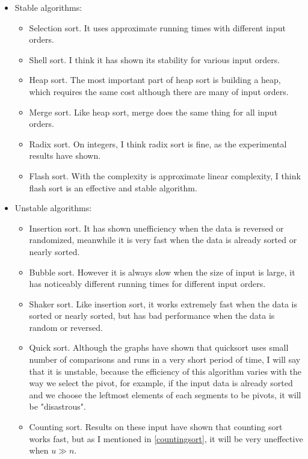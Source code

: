 \documentclass[12pt,a4paper]{article}
\begin{document}
\begin{itemize}
 \item Stable algorithms: 
 \begin{itemize}
  \item Selection sort. It uses approximate running times with different input orders.
  \item Shell sort. I think it has shown its stability for various input orders.
  \item Heap sort. The most important part of heap sort is building a heap, which requires the same cost although there are many of input orders.
  \item Merge sort. Like heap sort, merge does the same thing for all input orders.
  \item Radix sort. On integers, I think radix sort is fine, as the experimental results have shown.
  \item Flash sort. With the complexity is approximate linear complexity, I think flash sort is an effective and stable algorithm.
  \end{itemize} 
  \item Unstable algorithms:
  \begin{itemize}
  \item Insertion sort. It has shown unefficiency when the data is reversed or randomized, meanwhile it is very fast when the data is already sorted or nearly sorted.
  \item Bubble sort. However it is always slow when the size of input is large, it has noticeably different running times for different input orders.
  \item Shaker sort. Like insertion sort, it works extremely fast when the data is sorted or nearly sorted, but has bad performance when the data is random or reversed.
  \item Quick sort. Although the graphs have shown that quicksort uses small number of comparisons and runs in a very short period of time, I will say that it is unstable, because the efficiency of this algorithm varies with the way we select the pivot, for example, if the input data is already sorted and we choose the leftmost elements of each segments to be pivots, it will be "disastrous".
  \item Counting sort. Results on these input have shown that counting sort works fast, but as I mentioned in \ref{countingsort}, it will be very uneffective when $u \gg n.$
    \end{itemize}
 \end{itemize} 
 
\end{document}
